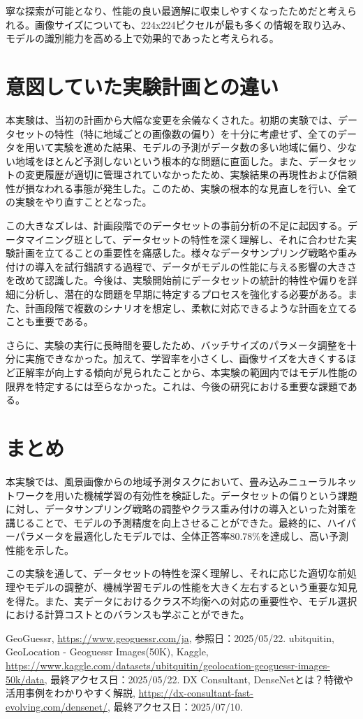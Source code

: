 \documentclass[a4paper, 11pt, titlepage]{jsarticle}
\begin{document}
寧な探索が可能となり、性能の良い最適解に収束しやすくなったためだと考えられる。画像サイズについても、224x224ピクセルが最も多くの情報を取り込み、モデルの識別能力を高める上で効果的であったと考えられる。

\section{意図していた実験計画との違い}
本実験は、当初の計画から大幅な変更を余儀なくされた。初期の実験では、データセットの特性（特に地域ごとの画像数の偏り）を十分に考慮せず、全てのデータを用いて実験を進めた結果、モデルの予測がデータ数の多い地域に偏り、少ない地域をほとんど予測しないという根本的な問題に直面した。また、データセットの変更履歴が適切に管理されていなかったため、実験結果の再現性および信頼性が損なわれる事態が発生した。このため、実験の根本的な見直しを行い、全ての実験をやり直すこととなった。

この大きなズレは、計画段階でのデータセットの事前分析の不足に起因する。データマイニング班として、データセットの特性を深く理解し、それに合わせた実験計画を立てることの重要性を痛感した。様々なデータサンプリング戦略や重み付けの導入を試行錯誤する過程で、データがモデルの性能に与える影響の大きさを改めて認識した。今後は、実験開始前にデータセットの統計的特性や偏りを詳細に分析し、潜在的な問題を早期に特定するプロセスを強化する必要がある。また、計画段階で複数のシナリオを想定し、柔軟に対応できるような計画を立てることも重要である。

さらに、実験の実行に長時間を要したため、バッチサイズのパラメータ調整を十分に実施できなかった。加えて、学習率を小さくし、画像サイズを大きくするほど正解率が向上する傾向が見られたことから、本実験の範囲内ではモデル性能の限界を特定するには至らなかった。これは、今後の研究における重要な課題である。

\section{まとめ}
本実験では、風景画像からの地域予測タスクにおいて、畳み込みニューラルネットワークを用いた機械学習の有効性を検証した。データセットの偏りという課題に対し、データサンプリング戦略の調整やクラス重み付けの導入といった対策を講じることで、モデルの予測精度を向上させることができた。最終的に、ハイパーパラメータを最適化したモデルでは、全体正答率80.78\%を達成し、高い予測性能を示した。

この実験を通して、データセットの特性を深く理解し、それに応じた適切な前処理やモデルの調整が、機械学習モデルの性能を大きく左右するという重要な知見を得た。また、実データにおけるクラス不均衡への対応の重要性や、モデル選択における計算コストとのバランスも学ぶことができた。

\begin{thebibliography}{n}
GeoGuessr, \url{https://www.geoguessr.com/ja}, 参照日：2025/05/22.
ubitquitin, GeoLocation - Geoguessr Images(50K), Kaggle, \url{https://www.kaggle.com/datasets/ubitquitin/geolocation-geoguessr-images-50k/data}, 最終アクセス日：2025/05/22.
DX Consultant, DenseNetとは？特徴や活用事例をわかりやすく解説, \url{https://dx-consultant-fast-evolving.com/densenet/}, 最終アクセス日：2025/07/10.
\end{thebibliography}
\end{document}
